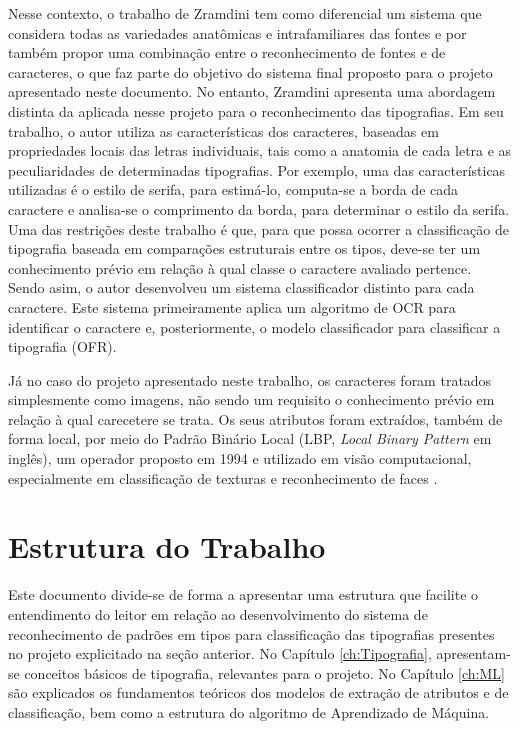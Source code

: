 Nesse contexto, o trabalho de Zramdini  tem como diferencial um sistema que considera todas as variedades anatômicas e intrafamiliares das fontes e por também propor uma combinação entre o reconhecimento de fontes e de caracteres, o que faz parte do objetivo do sistema final proposto para o projeto apresentado neste documento. No entanto, Zramdini  apresenta uma abordagem distinta da aplicada nesse projeto para o reconhecimento das tipografias. Em seu trabalho, o autor utiliza as características dos caracteres, baseadas em propriedades locais das letras individuais, tais como a anatomia de cada letra e as peculiaridades de determinadas tipografias. Por exemplo, uma das características utilizadas é o estilo de serifa, para estimá-lo, computa-se a borda de cada caractere e analisa-se o comprimento da borda, para determinar o estilo da serifa. Uma das restrições deste trabalho  é que, para que possa ocorrer a classificação de tipografia baseada em comparações estruturais entre os tipos, deve-se ter um conhecimento prévio em relação à qual classe o caractere avaliado pertence. Sendo asim, o autor desenvolveu um sistema classificador distinto para cada caractere. Este sistema primeiramente aplica um algoritmo de OCR para identificar o caractere e, posteriormente, o modelo classificador para classificar a tipografia (OFR).

Já no caso do projeto apresentado neste trabalho, os caracteres foram tratados simplesmente como imagens, não sendo um requisito o conhecimento prévio em relação à qual carecetere se trata. Os seus atributos foram extraídos, também de forma local, por meio do Padrão Binário Local (LBP, \textit{Local Binary Pattern} em inglês), um operador proposto em 1994 e utilizado em visão computacional, especialmente em classificação de texturas e reconhecimento de faces  .

\section{Estrutura do Trabalho}

Este documento divide-se de forma a apresentar uma estrutura que facilite o entendimento do leitor em relação ao desenvolvimento do sistema de reconhecimento de padrões em tipos para classificação das tipografias presentes no projeto explicitado na seção anterior. No Capítulo \ref{ch:Tipografia}, apresentam-se conceitos básicos de tipografia, relevantes para o projeto. No Capítulo \ref{ch:ML} são explicados os fundamentos teóricos dos modelos de extração de atributos e de classificação, bem como a estrutura do algoritmo de Aprendizado de Máquina.

